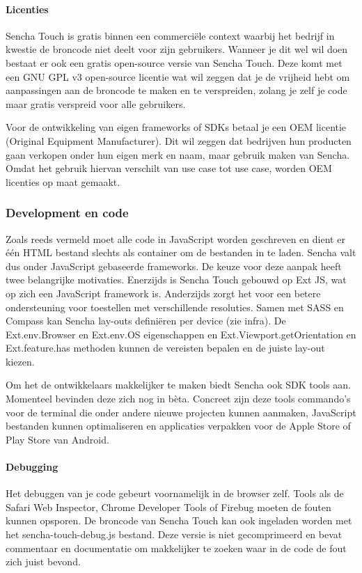 \paragraph{Licenties}
Sencha Touch is gratis binnen een commerciële context waarbij het bedrijf in kwestie de broncode niet deelt voor zijn gebruikers.  Wanneer je dit wel wil doen bestaat er ook een gratis open-source versie van Sencha Touch.  Deze komt met een GNU GPL v3 open-source licentie wat wil zeggen dat je de vrijheid hebt om aanpassingen aan de broncode te maken en te verspreiden,  zolang je zelf je code maar gratis verspreid voor alle gebruikers.
  
Voor de ontwikkeling van eigen frameworks of SDKs betaal je een OEM licentie (Original Equipment Manufacturer).  Dit wil zeggen dat bedrijven hun producten gaan verkopen onder hun eigen merk en naam, maar gebruik maken van Sencha.  Omdat het gebruik hiervan verschilt van use case tot use case,  worden OEM licenties op maat gemaakt.

\subsubsection{Development en code}
Zoals reeds vermeld moet alle code in JavaScript worden geschreven en dient er één HTML bestand slechts als container om de bestanden in te laden.  Sencha valt dus onder JavaScript gebaseerde frameworks.  De keuze voor deze aanpak heeft twee belangrijke motivaties.  Enerzijds is Sencha Touch gebouwd op Ext JS,  wat op zich een JavaScript framework is.  Anderzijds zorgt het voor een betere ondersteuning voor toestellen met verschillende resoluties.  Samen met SASS en Compass kan Sencha lay-outs definiëren per device (zie infra).  De Ext.env.Browser en Ext.env.OS eigenschappen en Ext.Viewport.getOrientation en Ext.feature.has methoden kunnen de vereisten bepalen en de juiste lay-out kiezen.

Om het de ontwikkelaars makkelijker te maken biedt Sencha ook SDK tools aan.  Momenteel bevinden deze zich nog in bèta.  Concreet zijn deze tools commando's voor de terminal die onder andere nieuwe projecten kunnen aanmaken, JavaScript bestanden kunnen optimaliseren en applicaties verpakken voor de Apple Store of Play Store van Android.  

\paragraph{Debugging}
Het debuggen van je code gebeurt voornamelijk in de browser zelf.  Tools als de Safari Web Inspector,  Chrome Developer Tools of Firebug moeten de fouten kunnen opsporen.  De broncode van Sencha Touch kan ook ingeladen worden met het sencha-touch-debug.js bestand.  Deze versie is niet gecomprimeerd en bevat commentaar en documentatie om makkelijker te zoeken waar in de code de fout zich juist bevond.


